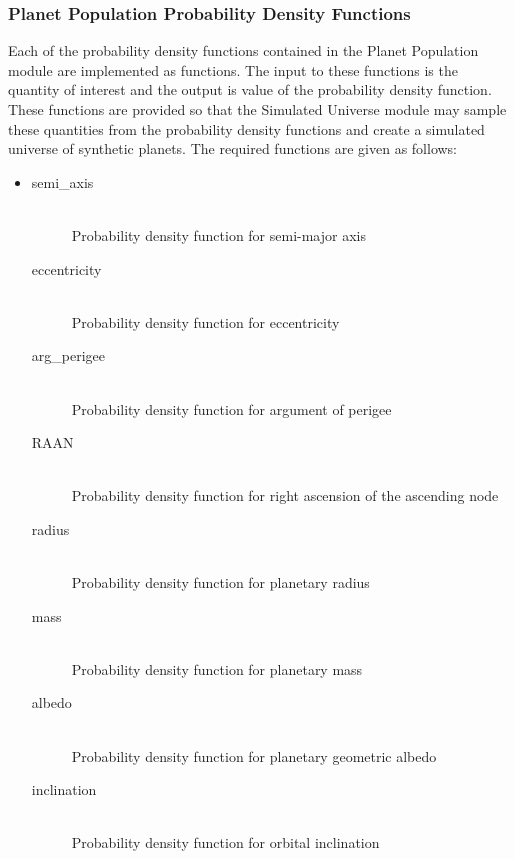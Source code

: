 \documentclass[cleanfoot]{asme2ej}
\begin{document}
\subsubsection{Planet Population Probability Density Functions} \label{sec:pdfs}
Each of the probability density functions contained in the Planet Population module are implemented as functions.  The input to these functions is the quantity of interest and the output is value of the probability density function.  These functions are provided so that the Simulated Universe module may sample these quantities from the probability density functions and create a simulated universe of synthetic planets.  The required functions are given as follows:

\begin{itemize}
    \item 
    \begin{description}
        \item[semi\_axis] \hfill \\
        Probability density function for semi-major axis
        \item[eccentricity] \hfill \\
        Probability density function for eccentricity
        \item[arg\_perigee] \hfill \\
        Probability density function for argument of perigee
        \item[RAAN] \hfill \\
        Probability density function for right ascension of the ascending node
        \item[radius] \hfill \\
        Probability density function for planetary radius
        \item[mass] \hfill \\
        Probability density function for planetary mass
        \item[albedo] \hfill \\
        Probability density function for planetary geometric albedo
        \item[inclination] \hfill \\
        Probability density function for orbital inclination
    \end{description}
\end{itemize}

\end{document}
